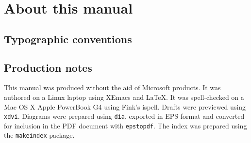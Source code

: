 \chapter{About this manual}

\section{Typographic conventions}

\section{Production notes}

This manual was produced without the aid of Microsoft products.
It was authored on a Linux laptop using XEmacs and
\LaTeX{}.
It was spell-checked on a Mac OS X Apple PowerBook G4 using Fink's ispell.
Drafts were previewed using
\texttt{xdvi}. Diagrams were prepared using \texttt{dia}, exported
in EPS format and converted for inclusion in the PDF document with \texttt{epstopdf}.  
The index was prepared using the \texttt{makeindex} package.

